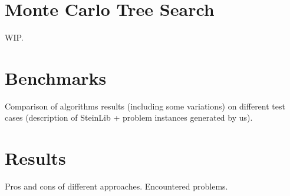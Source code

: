 \section{Monte Carlo Tree Search}
WIP.

\section{Benchmarks}
Comparison of algorithms results (including some variations) on different test cases (description of SteinLib + problem instances generated by us).

\section{Results}
Pros and cons of different approaches. Encountered problems.
